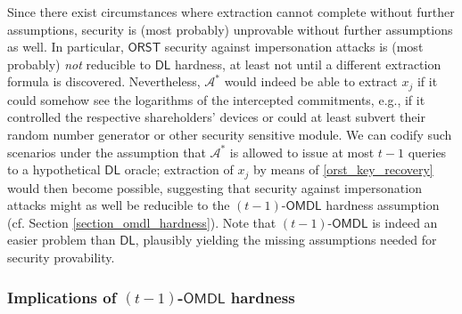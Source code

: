 \documentclass{iacrtrans}
\begin{document}
Since there exist circumstances where
extraction cannot complete without further assumptions,
security is (most probably)
unprovable without further assumptions as well.
In particular,
$\mathsf{ORST}$ security
against impersonation attacks is (most probably)
\textit{not} reducible to $\mathsf{DL}$ hardness,
at least not until a different extraction formula is discovered.
Nevertheless, $\mathcal{A}^*$ would indeed be able to extract $x_j$
if it could somehow see the logarithms
of the intercepted commitments, e.g.,
if it controlled the respective shareholders' devices
or could at least subvert their random number generator
or other security sensitive module.
We can codify such scenarios under the assumption
that $\mathcal{A}^*$ is allowed to issue at most
$t-1$ queries to a hypothetical $\mathsf{DL}$ oracle;
extraction of $x_j$ by means of \eqref{orst_key_recovery}
would then become possible,
suggesting that security against impersonation attacks
might as well be reducible to the
$(t-1)$-$\mathsf{OMDL}$ hardness assumption
(cf. Section \ref{section_omdl_hardness}).
Note that $(t-1)$-$\mathsf{OMDL}$ is indeed
an easier problem than $\mathsf{DL}$,
plausibly yielding the missing assumptions needed
for security provability.


\subsubsection{Implications of $(t-1)$-$\mathsf{OMDL}$ hardness}\label{section_omdl_implications}
\end{document}
